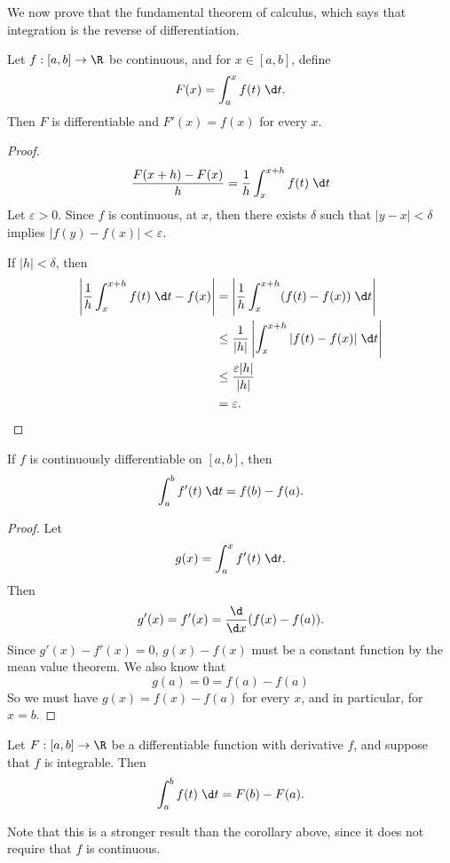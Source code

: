 \documentclass[a4paper]{article}
\begin{document}
We now prove that the fundamental theorem of calculus, which says that integration is the reverse of differentiation.
\begin{thm}
  Let $f: [a, b]\to \R$ be continuous, and for $x\in [a, b]$, define
  \[
    F(x) = \int_a^x f(t)\;\d t.
  \]
  Then $F$ is differentiable and $F'(x) = f(x)$ for every $x$.
\end{thm}

\begin{proof}
  \[
    \frac{F(x + h) - F(x)}{h} = \frac{1}{h}\int_x^{x + h}f(t)\;\d t
  \]
  Let $\varepsilon > 0$. Since $f$ is continuous, at $x$, then there exists $\delta$ such that $|y - x| < \delta$ implies $|f(y) - f(x)| < \varepsilon$.

  If $|h| < \delta$, then
  \begin{align*}
    \left|\frac{1}{h}\int_x^{x + h}f(t) \;\d t - f(x)\right| &= \left|\frac{1}{h}\int_x^{x + h}(f(t) - f(x))\;\d t\right|\\
    &\leq \frac{1}{|h|}\left|\int_x^{x + h}|f(t) - f(x)|\;\d t\right|\\
    &\leq \frac{\varepsilon|h|}{|h|}\\
    &= \varepsilon.
  \end{align*}
\end{proof}

\begin{cor}
  If $f$ is continuously differentiable on $[a, b]$, then
  \[
    \int_a^b f'(t)\;\d t = f(b) - f(a).
  \]
\end{cor}

\begin{proof}
  Let
  \[
    g(x) = \int_a^x f'(t)\;\d t.
  \]
  Then
  \[
    g'(x) = f'(x) = \frac{\d }{\d x}(f(x) - f(a)).
  \]
  Since $g'(x) - f'(x) = 0$, $g(x) - f(x)$ must be a constant function by the mean value theorem. We also know that
  \[
    g(a) = 0 = f(a) - f(a)
  \]
  So we must have $g(x) = f(x) - f(a)$ for every $x$, and in particular, for $x = b$.
\end{proof}

\begin{thm}
  Let $F: [a, b] \to \R$ be a differentiable function with derivative $f$, and suppose that $f$ is integrable. Then
  \[
    \int_a^b f(t)\;\d t = F(b) - F(a).
  \]
\end{thm}
Note that this is a stronger result than the corollary above, since it does not require that $f$ is continuous.
\end{document}
